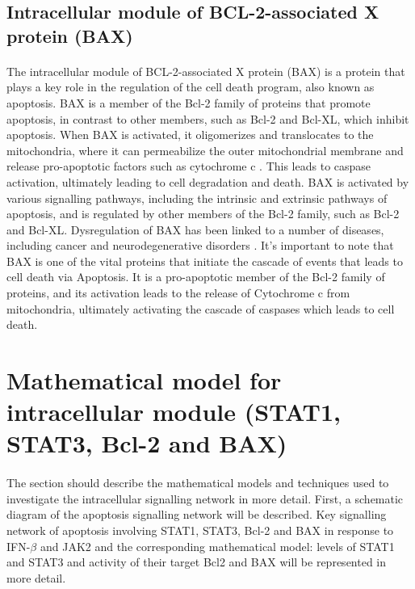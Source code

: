 \subsection{Intracellular module of BCL-2-associated X protein (BAX)}
\paragraph{}

The intracellular module of BCL-2-associated X protein (BAX) is a protein that plays a key role in the regulation of the cell death program, also known as apoptosis. BAX is a member of the Bcl-2 family of proteins that promote apoptosis, in contrast to other members, such as Bcl-2 and Bcl-XL, which inhibit apoptosis. When BAX is activated, it oligomerizes and translocates to the mitochondria, where it can permeabilize the outer mitochondrial membrane and release pro-apoptotic factors such as cytochrome c \cite{andreu2017bax}. This leads to caspase activation, ultimately leading to cell degradation and death. BAX is activated by various signalling pathways, including the intrinsic and extrinsic pathways of apoptosis, and is regulated by other members of the Bcl-2 family, such as Bcl-2 and Bcl-XL. Dysregulation of BAX has been linked to a number of diseases, including cancer and neurodegenerative disorders \cite{czabotar2014control}. It's important to note that BAX is one of the vital proteins that initiate the cascade of events that leads to cell death via Apoptosis. It is a pro-apoptotic member of the Bcl-2 family of proteins, and its activation leads to the release of Cytochrome c from mitochondria, ultimately activating the cascade of caspases which leads to cell death.





\section{Mathematical model for intracellular module (STAT1, STAT3, Bcl-2 and BAX)}

\paragraph{}
The section should describe the mathematical models and techniques used to investigate the intracellular signalling network in more detail. First, a schematic diagram of the apoptosis signalling network will be described.   Key signalling network of apoptosis involving STAT1, STAT3, Bcl-2 and BAX in response to IFN-$\beta$ and JAK2 and the corresponding mathematical model: levels of STAT1 and STAT3 and activity of their target Bcl2 and BAX will be represented in more detail. 

